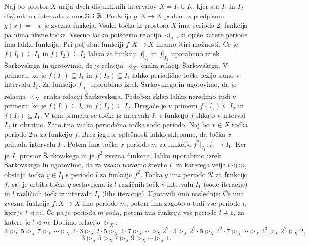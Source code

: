 \documentclass[../TG_magistrsko_delo_sections.tex]{subfiles}
\begin{document}
\begin{primer}
Naj bo prostor $X$ unija dveh disjunktnih intervalov $X=I_1 \cup I_2$, kjer sta $I_1$ in $I_2$ disjunktna intervala v množici $\mathbb R$. Funkcija $g : X \to X$ podana s predpisom $g(x) = -x$ je zvezna funkcja. Vsaka točka iz prostora $X$ ima periodo 2, funkcija pa nima fiksne točke. Vseeno lahko poiščemo relacijo $\triangleleft_X$, ki opiše katere periode ima lahko funkcija.  Pri poljubni funkciji $f: X \to X$ imamo štiri možnosti. Če je $f(I_1) \subseteq I_1$ in $f(I_2) \subseteq I_2$ lahko za funkciji $f|_{I_1}$ in $f|_{I_2}$ uporabimo izrek Šarkovskega in ugotovimo, de je relacija $\triangleleft_X$ enaka relaciji Šarkovskega. V primeru, ko je $f(I_1) \subseteq I_1$ in $f(I_2) \subseteq I_1$ lahko periodične točke ležijo samo v intervalu $I_1$. Za funkcijo $f|_{I_1}$ uporabimo izrek Šarkovskega in ugotovimo, da je relacija $\triangleleft_X$ enaka relaciji Šarkovskega. Podoben sklep lahko naredimo tudi v primeru, ko je $f(I_1) \subseteq I_2$ in $f(I_2) \subseteq I_2$. Drugače je v primeru $f(I_1) \subseteq I_2$ in $f(I_2) \subseteq I_1$. V tem primeru se točke iz intervala $I_1$ s funkcijo $f$ slikajo v interval $I_2$ in obratno. Zato ima vsaka periodična točka sodo periodo. Naj bo $x \in X$ točka periode $2m$ za funkcijo $f$. Brez izgube splošnosti lahko sklepamo, da točka $x$ pripada intervalu $I_1$. Potem ima točka $x$ periodo $m$ za funkcijo $f^2|_{I_1} :I_1 \to I_1$. Ker je $I_1$ prostor Šarkovskega in je $f^2$ zvezna funkcija, lahko uporabimo izrek Šarkovskega in ugotovimo, da za vsako naravno število $l$, za katerega velja $l \triangleleft m$, obstaja točka $y \in I_1$ s periodo $l$ za funkcijo $f^2$. Točka $y$ ima periodo $2l$ za funkcijo $f$, saj je orbita točke $y$ sestavljena iz $l$ različnih točk v intervalu $I_1$ (sode iteracije) in $l$ različnih točk iz intervala $I_2$ (lihe iteracije). 
Ugotovili smo naslednje: Če ima zvezna funkcija $f:X \to X$ liho periodo $m$, potem ima zagotovo tudi vse periode $l$, kjer je $l \triangleleft m$. Če pa je perioda $m$ soda, potem ima funkcija vse periode $l\neq1$, za katere je $l \triangleleft m$. 
Dobimo relacijo $\triangleright_X$:
$$3 \triangleright_X 5 \triangleright_X 7 \triangleright_X \cdots \triangleright_X 2\cdot 3 \triangleright_X 2\cdot 5 \triangleright_X 2\cdot 7 \triangleright_X \cdots \triangleright_X 2^2\cdot 3 \triangleright_X 2^2\cdot 5 \triangleright_X 2^2\cdot 7 \triangleright_X \cdots \triangleright_X 2^3 \triangleright_X 2^2 \triangleright_X 2,$$
$$3 \triangleright_X 5 \triangleright_X 7 \triangleright_X 9 \triangleright_X  \cdots \triangleright_X 1.$$
\end{primer}
\end{document}
